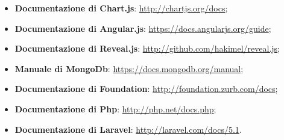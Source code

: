 \begin{itemize}
\begin{itemize}
\begin{itemize}
\begin{itemize}
						\end{itemize}
					\end{itemize}
					\item \textbf{Documentazione di \gls{Chart.js}}: \url{http://chartjs.org/docs};
					\item \textbf{Documentazione di \gls{Angular}.js}: \url{https://docs.angularjs.org/guide};
					\item \textbf{Documentazione di \gls{Reveal.js}}: \url{http://github.com/hakimel/reveal.js};
					\item \textbf{Manuale di \gls{MongoDb}}: \url{https://docs.mongodb.org/manual};
					\item \textbf{Documentazione di Foundation}: \url{http://foundation.zurb.com/docs};
 					\item \textbf{Documentazione di \gls{Php}}: \url{http://php.net/docs.php};
 					\item \textbf{Documentazione di \gls{Laravel}}: \url{http://laravel.com/docs/5.1}.
				\end{itemize}

	\end{itemize}
